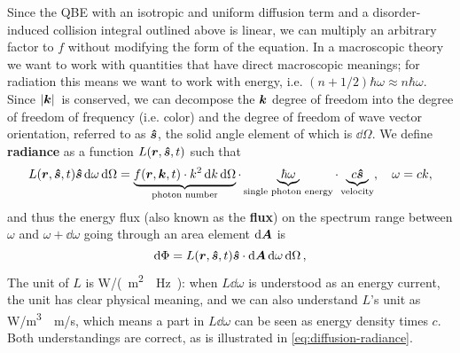 \documentclass[hyperref, a4paper]{article}
\newcommand*{\concept}[1]{{\textbf{#1}}}
\begin{document}
Since the QBE with an isotropic and uniform diffusion term 
and a disorder-induced collision integral outlined above 
is linear, we can multiply an arbitrary factor to $f$ 
without modifying the form of the equation.
In a macroscopic theory we want to work with quantities that 
have direct macroscopic meanings; 
for radiation this means we want to work with energy, 
i.e. $(n + 1/2) \hbar \omega \approx n \hbar \omega$.
Since $\abs*{\vb*{k}}$ is conserved, 
we can decompose the $\vb*{k}$ degree of freedom 
into the degree of freedom of frequency (i.e. color)
and the degree of freedom of wave vector orientation, 
referred to as $\vu*{s}$, 
the solid angle element of which is $\dd{\Omega}$. 
We define \concept{radiance} as a function $L(\vb*{r}, \vu*{s}, t)$ such that
\begin{equation}
    L(\vb*{r}, \vu*{s}, t) \vu*{s} \dd{\omega} \dd{\Omega} 
    = \underbrace{f(\vb*{r}, \vb*{k}, t) \cdot k^2 \dd{k} \dd{\Omega} }_{\text{photon number}}
    \cdot \underbrace{\hbar \omega}_{\text{single photon energy}} \cdot
    \underbrace{c \vu*{s}}_{\text{velocity}} , \quad 
    \omega = c k,
\end{equation}
and thus the energy flux (also known as the \concept{flux}) 
on the spectrum range between $\omega$ and $\omega + \dd{\omega}$
going through an area element $\dd{\vb*{A}}$ is 
\begin{equation}
    \dd{\Phi} = L(\vb*{r}, \vu*{s}, t) \vu*{s} \cdot \dd{\vb*{A}} \dd{\omega} \dd{\Omega},
\end{equation}
The unit of $L$ is \unit{W/(m^2 \cdot Hz)}: 
when $L \dd{\omega}$ is understood as an energy current, 
the unit has clear physical meaning, 
and we can also understand $L$'s unit as \unit{W/m^3 \cdot m/s},
which means a part in $L \dd{\omega}$ can be seen 
as energy density times $c$.
Both understandings are correct,
as is illustrated in \eqref{eq:diffusion-radiance}.
\end{document}
